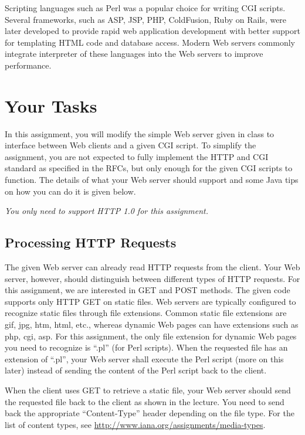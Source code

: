\documentclass[a4paper,11pt]{exam}
\begin{document}
Scripting languages such as Perl was a popular choice for writing CGI scripts. Several frameworks, such as ASP, JSP, PHP, ColdFusion, Ruby on Rails, were later developed to provide rapid web application development with better support for templating HTML code and database access. Modern Web servers commonly integrate interpreter of these languages into the Web servers to improve performance.

\section*{Your Tasks}

In this assignment, you will modify the simple Web server given in class to interface between Web clients and a given CGI script. To simplify the assignment, you are not expected to fully implement the HTTP and CGI standard as specified in the RFCs, but only enough for the given CGI scripts to function. The details of what your Web server should support and some Java tips on how you can do it is given below.

\textit{You only need to support HTTP 1.0 for this assignment.}

\subsection*{Processing HTTP Requests}

    The given Web server can already read HTTP requests from the client. Your Web server, however, should distinguish between different types of HTTP requests. For this assignment, we are interested in GET and POST methods. The given code supports only HTTP GET on static files. Web servers are typically configured to recognize static files through file extensions. Common static file extensions are gif, jpg, htm, html, etc., whereas dynamic Web pages can have extensions such as php, cgi, asp. For this assignment, the only file extension for dynamic Web pages you need to recognize is ``.pl'' (for Perl scripts).  When the requested file has an extension of ``.pl'', your Web server shall execute the Perl script (more on this later) instead of sending the content of the Perl script back to the client.

	When the client uses GET to retrieve a static file, your Web server should send the requested file back to the client as shown in the lecture.  You need to send back the appropriate ``Content-Type'' header depending on the file type.  For the list of content types, see \url{http://www.iana.org/assignments/media-types}.
\end{document}

